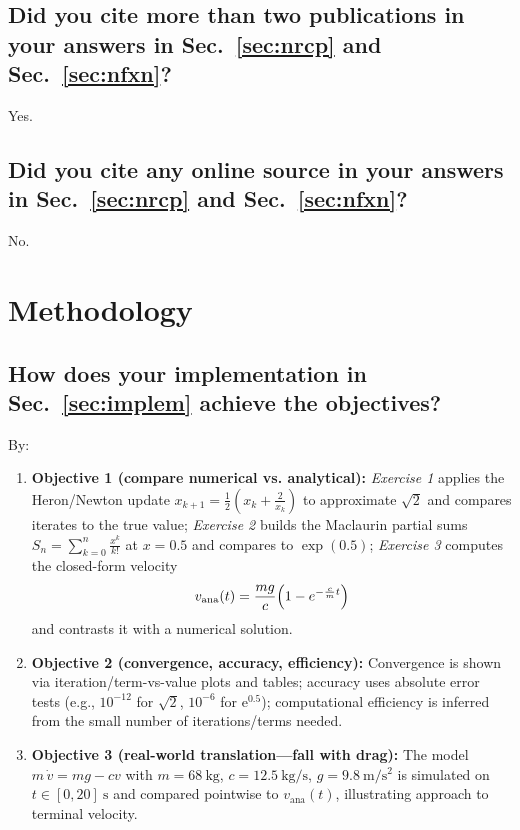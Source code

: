 \subsection{Did you cite more than two publications in your answers in Sec.~\ref{sec:nrcp} and Sec.~\ref{sec:nfxn}?}
Yes.
	
\subsection{Did you cite any online source in your answers in Sec.~\ref{sec:nrcp} and Sec.~\ref{sec:nfxn}?}
No.
  
	
	
	
	
	
	
	
	
	


\section{Methodology}

\subsection{How does your implementation in Sec.~\ref{sec:implem} achieve the objectives?}
By:
\begin{enumerate}
  \item \textbf{Objective 1 (compare numerical vs. analytical):} 
  \emph{Exercise 1} applies the Heron/Newton update 
  \(x_{k+1}=\tfrac12\!\left(x_k+\tfrac{2}{x_k}\right)\) to approximate \(\sqrt{2}\) and
  compares iterates to the true value; \emph{Exercise 2} builds the Maclaurin partial sums
  \(S_n=\sum_{k=0}^{n}\tfrac{x^{k}}{k!}\) at \(x=0.5\) and compares to \(\exp(0.5)\);
  \emph{Exercise 3} computes the closed-form velocity
  \[
    v_{\mathrm{ana}}(t)=\frac{mg}{c}\Bigl(1-e^{-\frac{c}{m}t}\Bigr)
  \]
  and contrasts it with a numerical solution.
  \item \textbf{Objective 2 (convergence, accuracy, efficiency):}
  Convergence is shown via iteration/term-vs-value plots and tables; accuracy uses absolute
  error tests (e.g., \(10^{-12}\) for \(\sqrt{2}\), \(10^{-6}\) for \(\mathrm{e}^{0.5}\));
  computational efficiency is inferred from the small number of iterations/terms needed.
  \item \textbf{Objective 3 (real-world translation—fall with drag):}
  The model \(m\,\dot v=mg-cv\) with \(m=68~\mathrm{kg}\), \(c=12.5~\mathrm{kg/s}\),
  \(g=9.8~\mathrm{m/s^2}\) is simulated on \(t\in[0,20]~\mathrm{s}\) and compared pointwise
  to \(v_{\mathrm{ana}}(t)\), illustrating approach to terminal velocity.
\end{enumerate}
	
